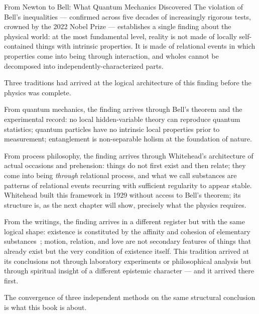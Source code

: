 \begin{convergencemoment}{From Newton to Bell: What Quantum Mechanics Discovered}
The violation of Bell's inequalities --- confirmed across five decades of increasingly rigorous tests, crowned by the 2022 Nobel Prize --- establishes a single finding about the physical world: at the most fundamental level, reality is not made of locally self-contained things with intrinsic properties. It is made of relational events in which properties come into being through interaction, and wholes cannot be decomposed into independently-characterized parts.

Three traditions had arrived at the logical architecture of this finding before the physics was complete.

From quantum mechanics, the finding arrives through Bell's theorem and the experimental record: no local hidden-variable theory can reproduce quantum statistics; quantum particles have no intrinsic local properties prior to measurement; entanglement is non-separable holism at the foundation of nature.

From process philosophy, the finding arrives through Whitehead's architecture of actual occasions and prehension: things do not first exist and then relate; they come into being \emph{through} relational process, and what we call substances are patterns of relational events recurring with sufficient regularity to appear stable. Whitehead built this framework in 1929 without access to Bell's theorem; its structure is, as the next chapter will show, precisely what the physics requires.

From the \bahai writings, the finding arrives in a different register but with the same logical shape: existence is constituted by the affinity and cohesion of elementary substances~\citep{PUP}; motion, relation, and love are not secondary features of things that already exist but the very condition of existence itself. This tradition arrived at its conclusions not through laboratory experiments or philosophical analysis but through spiritual insight of a different epistemic character --- and it arrived there first.

The convergence of three independent methods on the same structural conclusion is what this book is about.
\end{convergencemoment}
